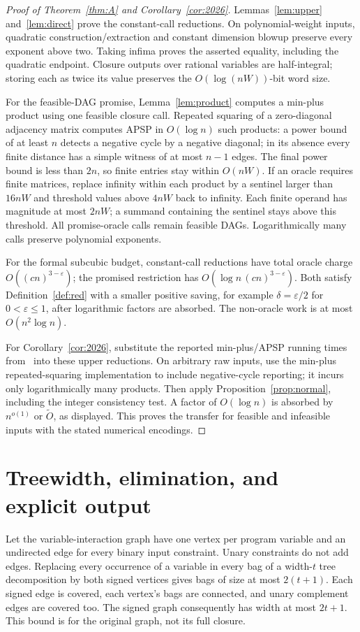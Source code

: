 \documentclass[manuscript,11pt,screen,nonacm]{acmart}
\theoremstyle{definition}
\begin{document}
\begin{proof}[Proof of Theorem~\ref{thm:A} and Corollary~\ref{cor:2026}]
Lemmas~\ref{lem:upper} and~\ref{lem:direct} prove the constant-call reductions. On polynomial-weight inputs, quadratic construction/extraction and constant dimension blowup preserve every exponent above two. Taking infima proves the asserted equality, including the quadratic endpoint. Closure outputs over rational variables are half-integral; storing each as twice its value preserves the $O(\log(nW))$-bit word size.

For the feasible-DAG promise, Lemma~\ref{lem:product} computes a min-plus product using one feasible closure call. Repeated squaring of a zero-diagonal adjacency matrix computes APSP in $O(\log n)$ such products: a power bound of at least $n$ detects a negative cycle by a negative diagonal; in its absence every finite distance has a simple witness of at most $n-1$ edges. The final power bound is less than $2n$, so finite entries stay within $O(nW)$. If an oracle requires finite matrices, replace infinity within each product by a sentinel larger than $16nW$ and threshold values above $4nW$ back to infinity. Each finite operand has magnitude at most $2nW$; a summand containing the sentinel stays above this threshold. All promise-oracle calls remain feasible DAGs. Logarithmically many calls preserve polynomial exponents.

For the formal subcubic budget, constant-call reductions have total oracle charge $O((cn)^{3-\varepsilon})$; the promised restriction has $O(\log n\,(cn)^{3-\varepsilon})$. Both satisfy Definition~\ref{def:red} with a smaller positive saving, for example $\delta=\varepsilon/2$ for $0<\varepsilon\leq1$, after logarithmic factors are absorbed. The non-oracle work is at most $O(n^2\log n)$.

For Corollary~\ref{cor:2026}, substitute the reported min-plus/APSP running times from~\cite{alman2026,saha2026,majdoddin2026} into these upper reductions. On arbitrary raw inputs, use the min-plus repeated-squaring implementation to include negative-cycle reporting; it incurs only logarithmically many products. Then apply Proposition~\ref{prop:normal}, including the integer consistency test. A factor of $O(\log n)$ is absorbed by $n^{o(1)}$ or $\widetilde O$, as displayed. This proves the transfer for feasible and infeasible inputs with the stated numerical encodings.
\end{proof}

\section{Treewidth, elimination, and explicit output}\label{sec:width}
Let the variable-interaction graph have one vertex per program variable and an undirected edge for every binary input constraint. Unary constraints do not add edges. Replacing every occurrence of a variable in every bag of a width-$t$ tree decomposition by both signed vertices gives bags of size at most $2(t+1)$. Each signed edge is covered, each vertex's bags are connected, and unary complement edges are covered too. The signed graph consequently has width at most $2t+1$. This bound is for the original graph, not its full closure.
\end{document}

